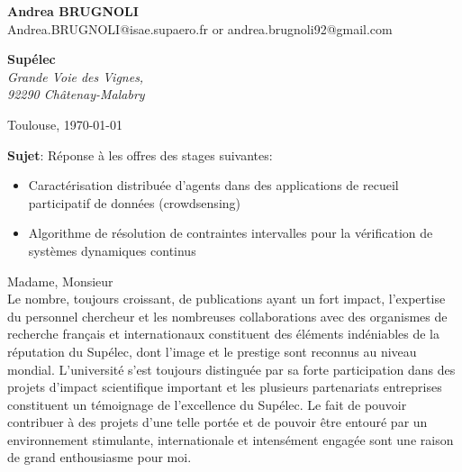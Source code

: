 \documentclass[11pt]{letter}
\begin{document}
 \sffamily
 \begin{flushleft}
 {\bfseries Andrea \textsc{BRUGNOLI}}\\[.35ex]
 Andrea.BRUGNOLI@isae.supaero.fr or andrea.brugnoli92@gmail.com
 \end{flushleft}
 \begin{flushright}
 {\bfseries Supélec}\\[.35ex]
 \small\itshape
 Grande Voie des Vignes, \\
 92290 Châtenay-Malabry
 \end{flushright}
 \begin{flushright}
 Toulouse, \today 
 \end{flushright}
 \textbf{Sujet}: Réponse à les offres des stages suivantes:
 \begin{itemize}
\setlength\itemsep{0.4pt}
\item Caractérisation distribuée d’agents
dans des applications de recueil participatif de données (crowdsensing)
\item Algorithme de résolution de contraintes intervalles pour la vérification de systèmes dynamiques continus
\end{itemize}


Madame, Monsieur \\
Le nombre, toujours croissant, de publications ayant un fort impact, l'expertise du personnel chercheur et les nombreuses collaborations avec des organismes de recherche français et internationaux constituent  des éléments indéniables de la réputation du Supélec, dont l'image et le prestige sont reconnus au niveau mondial. L'université s'est toujours distinguée par sa forte participation dans des projets d'impact scientifique important et les plusieurs partenariats entreprises constituent un témoignage de l'excellence du Supélec. Le fait de pouvoir contribuer à des projets d'une telle portée et de pouvoir être entouré par un environnement stimulante, internationale et intensément engagée sont une raison de grand enthousiasme pour moi. 
\end{document}
